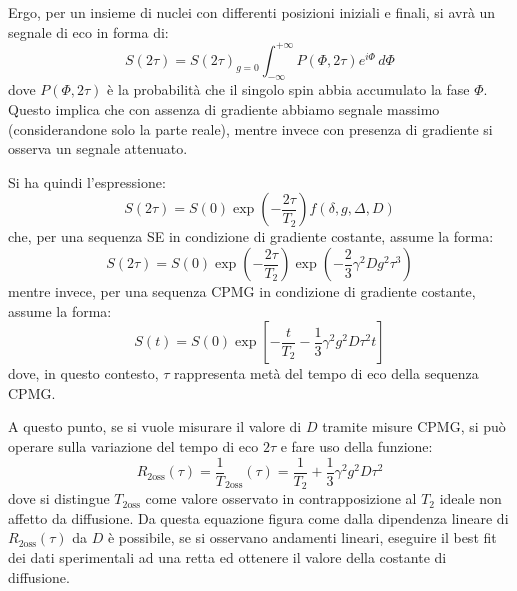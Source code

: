 Ergo, per un insieme di nuclei con differenti posizioni iniziali e finali, si avrà un segnale di eco in forma di:
\begin{equation}
	S(2\tau) = S(2\tau)_{g=0}\int_{-\infty}^{+\infty} P(\Phi,2\tau)e^{i\Phi}\,d\Phi
\end{equation}
dove $P(\Phi,2\tau)$ è la probabilità che il singolo spin abbia accumulato la fase $\Phi$. Questo implica che con assenza di gradiente abbiamo segnale massimo (considerandone solo la parte reale), mentre invece con presenza di gradiente si osserva un segnale attenuato.

Si ha quindi l'espressione:
\begin{equation}
	S(2\tau) = S(0) \exp\left(-\frac{2\tau}{T_2}\right) f(\delta,g,\Delta,D)
\end{equation}
che, per una sequenza SE in condizione di gradiente costante, assume la forma:
\begin{equation}
	S(2\tau) = S(0)\exp(-\frac{2\tau}{T_2})\exp(-\frac{2}{3}\gamma^2Dg^2\tau^3)
\end{equation}
mentre invece, per una sequenza CPMG in condizione di gradiente costante, assume la forma:
\begin{equation}
	S(t) = S(0)\exp\left[-\frac{t}{T_2}-\frac{1}{3}\gamma^2 g^2 D\tau^2 t\right]
\end{equation}
dove, in questo contesto, $\tau$ rappresenta metà del tempo di eco della sequenza CPMG.

A questo punto, se si vuole misurare il valore di $D$ tramite misure CPMG, si può operare sulla variazione del tempo di eco $2\tau$ e fare uso della funzione:
\begin{equation}
	R_{\text{2oss}}(\tau) = \frac{1}{T}_{\text{2oss}}(\tau)=\frac{1}{T_2}+\frac{1}{3}\gamma^2g^2D\tau^2
\label{eq:R}
\end{equation}
dove si distingue $T_{\text{2oss}}$ come valore osservato in contrapposizione al $T_2$ ideale non affetto da diffusione. Da questa equazione figura come dalla dipendenza lineare di $R_{\text{2oss}}(\tau)$ da $D$ è possibile, se si osservano andamenti lineari, eseguire il best fit dei dati sperimentali ad una retta ed ottenere il valore della costante di diffusione.

